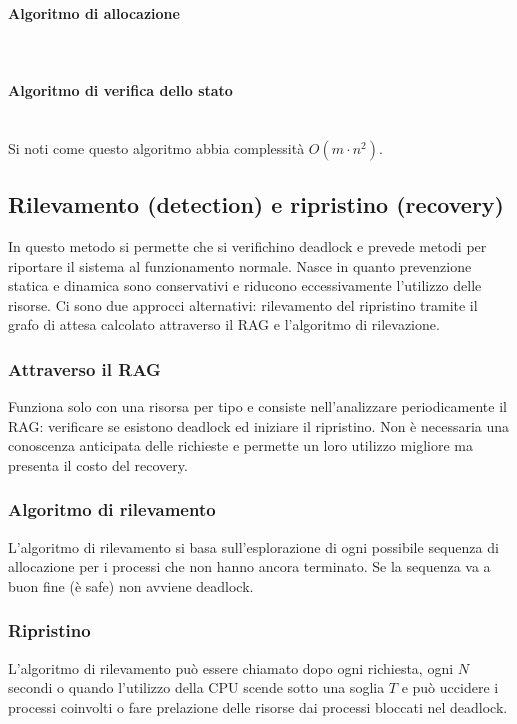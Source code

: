 \paragraph{Algoritmo di allocazione}\mbox{}\\

\paragraph{Algoritmo di verifica dello stato}\mbox{}\\

Si noti come questo algoritmo abbia complessit\`a $O(m\cdot n^2)$.
\subsection{Rilevamento (detection) e ripristino (recovery)}
In questo metodo si permette che si verifichino deadlock e prevede metodi per riportare il sistema al funzionamento normale. Nasce in quanto prevenzione statica e dinamica sono 
conservativi e riducono eccessivamente l'utilizzo delle risorse. Ci sono due approcci alternativi: rilevamento del ripristino tramite il grafo di attesa calcolato attraverso il RAG
e l'algoritmo di rilevazione.
\subsubsection{Attraverso il RAG}
Funziona solo con una risorsa per tipo e consiste nell'analizzare periodicamente il RAG: verificare se esistono deadlock ed iniziare il ripristino. Non \`e necessaria una conoscenza
anticipata delle richieste e permette un loro utilizzo migliore ma presenta il costo del recovery. 
\subsubsection{Algoritmo di rilevamento}
L'algoritmo di rilevamento si basa sull'esplorazione di ogni possibile sequenza di allocazione per i processi che non hanno ancora terminato. Se la sequenza va a buon fine (\`e safe)
non avviene deadlock.


\subsubsection{Ripristino}
L'algoritmo di rilevamento pu\`o essere chiamato dopo ogni richiesta, ogni $N$ secondi o quando l'utilizzo della CPU scende sotto una soglia $T$ e pu\`o uccidere i processi coinvolti o 
fare prelazione delle risorse dai processi bloccati nel deadlock. 
